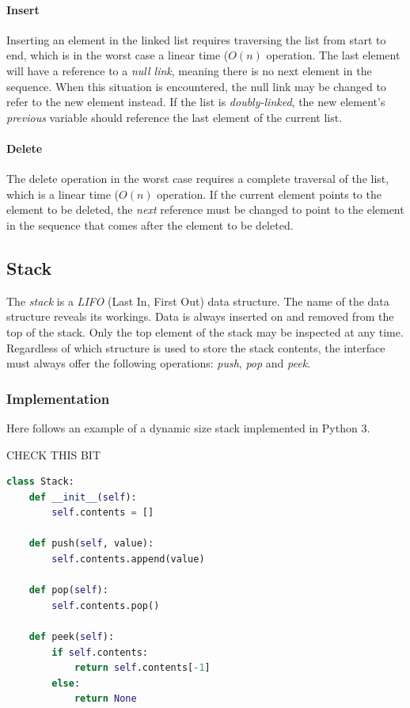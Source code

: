 \documentclass{article}
\begin{document}
\paragraph{Insert}
Inserting an element in the linked list requires traversing the list from start to end,
which is in the worst case a linear time (\(O(n)\) operation.
The last element will have a reference to a {\em null link}, meaning there is no next element in the sequence.
When this situation is encountered, the null link may be changed to refer to the new element instead.
If the list is {\em doubly-linked}, the new element's {\em previous} variable should reference the last element of the current list.

\paragraph{Delete}
The delete operation in the worst case requires a complete traversal of the list,
which is a linear time (\(O(n)\) operation. If the current element points to the element to be deleted,
the {\em next} reference must be changed to point to the element in the sequence that comes after the element to be deleted.


\subsection{Stack}
The {\em stack} is a {\em LIFO} (Last In, First Out) data structure.
The name of the data structure reveals its workings.
Data is always inserted on and removed from the top of the stack.
Only the top element of the stack may be inspected at any time.
Regardless of which structure is used to store the stack contents,
the interface must always offer the following operations: {\em push}, {\em pop} and {\em peek}.

\subsubsection{Implementation}
Here follows an example of a dynamic size stack implemented in Python 3.

\huge CHECK THIS BIT
\begin{lstlisting}[language=Python]
  class Stack:
    def __init__(self):
        self.contents = []

    def push(self, value):
        self.contents.append(value)

    def pop(self):
        self.contents.pop()

    def peek(self):
        if self.contents:
            return self.contents[-1]
        else:
            return None
\end{lstlisting}
\end{document}
